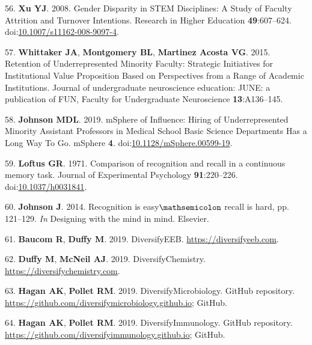 \documentclass[10pt,]{article}
\begin{document}
\hypertarget{ref-xu_gender_2008}{}
56. \textbf{Xu YJ}. 2008. Gender Disparity in STEM Disciplines: A Study
of Faculty Attrition and Turnover Intentions. Research in Higher
Education \textbf{49}:607--624.
doi:\href{https://doi.org/10.1007/s11162-008-9097-4}{10.1007/s11162-008-9097-4}.

\hypertarget{ref-whittaker_retention_2015}{}
57. \textbf{Whittaker JA}, \textbf{Montgomery BL}, \textbf{Martinez
Acosta VG}. 2015. Retention of Underrepresented Minority Faculty:
Strategic Initiatives for Institutional Value Proposition Based on
Perspectives from a Range of Academic Institutions. Journal of
undergraduate neuroscience education: JUNE: a publication of FUN,
Faculty for Undergraduate Neuroscience \textbf{13}:A136--145.

\hypertarget{ref-johnson_msphere_2019}{}
58. \textbf{Johnson MDL}. 2019. mSphere of Influence: Hiring of
Underrepresented Minority Assistant Professors in Medical School Basic
Science Departments Has a Long Way To Go. mSphere \textbf{4}.
doi:\href{https://doi.org/10.1128/mSphere.00599-19}{10.1128/mSphere.00599-19}.

\hypertarget{ref-Loftus1971}{}
59. \textbf{Loftus GR}. 1971. Comparison of recognition and recall in a
continuous memory task. Journal of Experimental Psychology
\textbf{91}:220--226.
doi:\href{https://doi.org/10.1037/h0031841}{10.1037/h0031841}.

\hypertarget{ref-Johnson2014}{}
60. \textbf{Johnson J}. 2014. Recognition is easy\(\mathsemicolon\)
recall is hard, pp. 121--129. \emph{In} Designing with the mind in mind.
Elsevier.

\hypertarget{ref-Baucom_2019}{}
61. \textbf{Baucom R}, \textbf{Duffy M}. 2019. DiversifyEEB.
\url{https://diversifyeeb.com}.

\hypertarget{ref-Duffy_2019}{}
62. \textbf{Duffy M}, \textbf{McNeil AJ}. 2019. DiversifyChemistry.
\url{https://diversifychemistry.com}.

\hypertarget{ref-Hagan2019_micro}{}
63. \textbf{Hagan AK}, \textbf{Pollet RM}. 2019. DiversifyMicrobiology.
GitHub repository.
\url{https://github.com/diversifymicrobiology.github.io}; GitHub.

\hypertarget{ref-Hagan2019_immuno}{}
64. \textbf{Hagan AK}, \textbf{Pollet RM}. 2019. DiversifyImmunology.
GitHub repository.
\url{https://github.com/diversifyimmunology.github.io}; GitHub.
\end{document}

